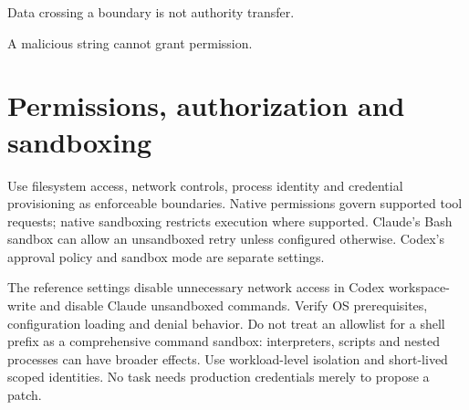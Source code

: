 \documentclass[11pt,letterpaper]{article}
\begin{document}
\begin{center}\begin{minipage}{\linewidth}\captionsetup{type=figure}\centering{}\caption{Security trust-boundary diagram}
\small Data crossing a boundary is not authority transfer.\end{minipage}\end{center}
\begin{center}\begin{minipage}{\linewidth}\captionsetup{type=figure}\centering{}\caption{Prompt injection defense architecture}
\small A malicious string cannot grant permission.\end{minipage}\end{center}
\section{Permissions, authorization and sandboxing}
Use filesystem access, network controls, process identity and credential provisioning as enforceable boundaries. Native permissions govern supported tool requests; native sandboxing restricts execution where supported. Claude's Bash sandbox can allow an unsandboxed retry unless configured otherwise. Codex's approval policy and sandbox mode are separate settings. \cite{cperm,csandbox,oconfig,osec}

The reference settings disable unnecessary network access in Codex workspace-write and disable Claude unsandboxed commands. Verify OS prerequisites, configuration loading and denial behavior. Do not treat an allowlist for a shell prefix as a comprehensive command sandbox: interpreters, scripts and nested processes can have broader effects. Use workload-level isolation and short-lived scoped identities. No task needs production credentials merely to propose a patch.
\end{document}
